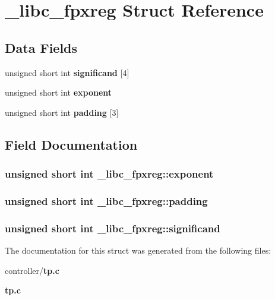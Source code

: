 \section{\_\-libc\_\-fpxreg Struct Reference}
\label{struct__libc__fpxreg}
\subsection*{Data Fields}
\begin{DoxyCompactItemize}
\item 
unsigned short int {\bf significand} [4]
\item 
unsigned short int {\bf exponent}
\item 
unsigned short int {\bf padding} [3]
\end{DoxyCompactItemize}


\subsection{Field Documentation}
\subsubsection[{exponent}]{\setlength{\rightskip}{0pt plus 5cm}unsigned short int {\bf \_\-libc\_\-fpxreg::exponent}}\label{struct__libc__fpxreg_a3c83d7321d2825fdb38bd13c2554db12}
\subsubsection[{padding}]{\setlength{\rightskip}{0pt plus 5cm}unsigned short int {\bf \_\-libc\_\-fpxreg::padding}}\label{struct__libc__fpxreg_add7a3161d3aa8f14c51d9cfb9b6493e1}
\subsubsection[{significand}]{\setlength{\rightskip}{0pt plus 5cm}unsigned short int {\bf \_\-libc\_\-fpxreg::significand}}\label{struct__libc__fpxreg_a603471628e26b05a7cccab21a1e4e638}


The documentation for this struct was generated from the following files:\begin{DoxyCompactItemize}
\item 
controller/{\bf tp.c}\item 
{\bf tp.c}\end{DoxyCompactItemize}
